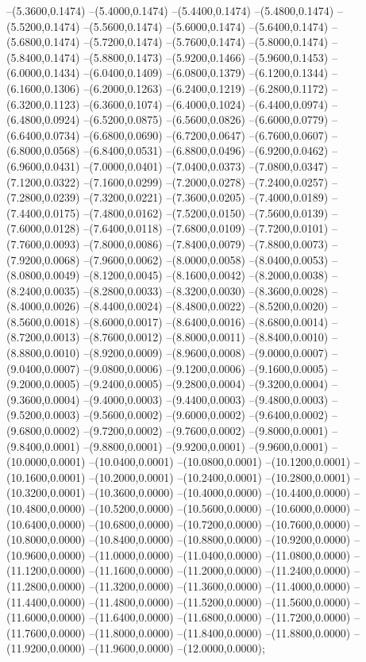 {	--(5.3600,0.1474)
	--(5.4000,0.1474)
	--(5.4400,0.1474)
	--(5.4800,0.1474)
	--(5.5200,0.1474)
	--(5.5600,0.1474)
	--(5.6000,0.1474)
	--(5.6400,0.1474)
	--(5.6800,0.1474)
	--(5.7200,0.1474)
	--(5.7600,0.1474)
	--(5.8000,0.1474)
	--(5.8400,0.1474)
	--(5.8800,0.1473)
	--(5.9200,0.1466)
	--(5.9600,0.1453)
	--(6.0000,0.1434)
	--(6.0400,0.1409)
	--(6.0800,0.1379)
	--(6.1200,0.1344)
	--(6.1600,0.1306)
	--(6.2000,0.1263)
	--(6.2400,0.1219)
	--(6.2800,0.1172)
	--(6.3200,0.1123)
	--(6.3600,0.1074)
	--(6.4000,0.1024)
	--(6.4400,0.0974)
	--(6.4800,0.0924)
	--(6.5200,0.0875)
	--(6.5600,0.0826)
	--(6.6000,0.0779)
	--(6.6400,0.0734)
	--(6.6800,0.0690)
	--(6.7200,0.0647)
	--(6.7600,0.0607)
	--(6.8000,0.0568)
	--(6.8400,0.0531)
	--(6.8800,0.0496)
	--(6.9200,0.0462)
	--(6.9600,0.0431)
	--(7.0000,0.0401)
	--(7.0400,0.0373)
	--(7.0800,0.0347)
	--(7.1200,0.0322)
	--(7.1600,0.0299)
	--(7.2000,0.0278)
	--(7.2400,0.0257)
	--(7.2800,0.0239)
	--(7.3200,0.0221)
	--(7.3600,0.0205)
	--(7.4000,0.0189)
	--(7.4400,0.0175)
	--(7.4800,0.0162)
	--(7.5200,0.0150)
	--(7.5600,0.0139)
	--(7.6000,0.0128)
	--(7.6400,0.0118)
	--(7.6800,0.0109)
	--(7.7200,0.0101)
	--(7.7600,0.0093)
	--(7.8000,0.0086)
	--(7.8400,0.0079)
	--(7.8800,0.0073)
	--(7.9200,0.0068)
	--(7.9600,0.0062)
	--(8.0000,0.0058)
	--(8.0400,0.0053)
	--(8.0800,0.0049)
	--(8.1200,0.0045)
	--(8.1600,0.0042)
	--(8.2000,0.0038)
	--(8.2400,0.0035)
	--(8.2800,0.0033)
	--(8.3200,0.0030)
	--(8.3600,0.0028)
	--(8.4000,0.0026)
	--(8.4400,0.0024)
	--(8.4800,0.0022)
	--(8.5200,0.0020)
	--(8.5600,0.0018)
	--(8.6000,0.0017)
	--(8.6400,0.0016)
	--(8.6800,0.0014)
	--(8.7200,0.0013)
	--(8.7600,0.0012)
	--(8.8000,0.0011)
	--(8.8400,0.0010)
	--(8.8800,0.0010)
	--(8.9200,0.0009)
	--(8.9600,0.0008)
	--(9.0000,0.0007)
	--(9.0400,0.0007)
	--(9.0800,0.0006)
	--(9.1200,0.0006)
	--(9.1600,0.0005)
	--(9.2000,0.0005)
	--(9.2400,0.0005)
	--(9.2800,0.0004)
	--(9.3200,0.0004)
	--(9.3600,0.0004)
	--(9.4000,0.0003)
	--(9.4400,0.0003)
	--(9.4800,0.0003)
	--(9.5200,0.0003)
	--(9.5600,0.0002)
	--(9.6000,0.0002)
	--(9.6400,0.0002)
	--(9.6800,0.0002)
	--(9.7200,0.0002)
	--(9.7600,0.0002)
	--(9.8000,0.0001)
	--(9.8400,0.0001)
	--(9.8800,0.0001)
	--(9.9200,0.0001)
	--(9.9600,0.0001)
	--(10.0000,0.0001)
	--(10.0400,0.0001)
	--(10.0800,0.0001)
	--(10.1200,0.0001)
	--(10.1600,0.0001)
	--(10.2000,0.0001)
	--(10.2400,0.0001)
	--(10.2800,0.0001)
	--(10.3200,0.0001)
	--(10.3600,0.0000)
	--(10.4000,0.0000)
	--(10.4400,0.0000)
	--(10.4800,0.0000)
	--(10.5200,0.0000)
	--(10.5600,0.0000)
	--(10.6000,0.0000)
	--(10.6400,0.0000)
	--(10.6800,0.0000)
	--(10.7200,0.0000)
	--(10.7600,0.0000)
	--(10.8000,0.0000)
	--(10.8400,0.0000)
	--(10.8800,0.0000)
	--(10.9200,0.0000)
	--(10.9600,0.0000)
	--(11.0000,0.0000)
	--(11.0400,0.0000)
	--(11.0800,0.0000)
	--(11.1200,0.0000)
	--(11.1600,0.0000)
	--(11.2000,0.0000)
	--(11.2400,0.0000)
	--(11.2800,0.0000)
	--(11.3200,0.0000)
	--(11.3600,0.0000)
	--(11.4000,0.0000)
	--(11.4400,0.0000)
	--(11.4800,0.0000)
	--(11.5200,0.0000)
	--(11.5600,0.0000)
	--(11.6000,0.0000)
	--(11.6400,0.0000)
	--(11.6800,0.0000)
	--(11.7200,0.0000)
	--(11.7600,0.0000)
	--(11.8000,0.0000)
	--(11.8400,0.0000)
	--(11.8800,0.0000)
	--(11.9200,0.0000)
	--(11.9600,0.0000)
	--(12.0000,0.0000);
}
